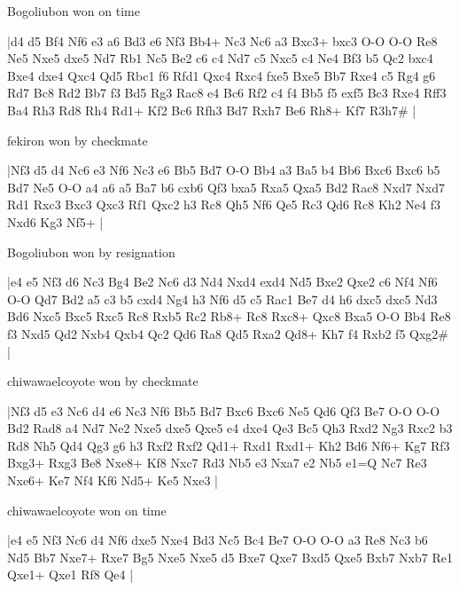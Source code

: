 \showboard

Bogoliubon won on time

\makegametitle
|d4 d5 Bf4 Nf6 e3 a6 Bd3 e6 Nf3 Bb4+ Nc3 Nc6 a3 Bxc3+ bxc3 O-O O-O Re8 Ne5 Nxe5 dxe5 Nd7 Rb1 Nc5 Be2 c6 c4 Nd7 c5 Nxc5 c4 Ne4 Bf3 b5 Qc2 bxc4 Bxe4 dxe4 Qxc4 Qd5 Rbc1 f6 Rfd1 Qxc4 Rxc4 fxe5 Bxe5 Bb7 Rxe4 c5 Rg4 g6 Rd7 Bc8 Rd2 Bb7 f3 Bd5 Rg3 Rac8 e4 Bc6 Rf2 c4 f4 Bb5 f5 exf5 Bc3 Rxe4 Rff3 Ba4 Rh3 Rd8 Rh4 Rd1+ Kf2 Bc6 Rfh3 Bd7 Rxh7 Be6 Rh8+ Kf7 R3h7\#  |

\showboard

fekiron won by checkmate

\makegametitle
|Nf3 d5 d4 Nc6 e3 Nf6 Nc3 e6 Bb5 Bd7 O-O Bb4 a3 Ba5 b4 Bb6 Bxc6 Bxc6 b5 Bd7 Ne5 O-O a4 a6 a5 Ba7 b6 cxb6 Qf3 bxa5 Rxa5 Qxa5 Bd2 Rac8 Nxd7 Nxd7 Rd1 Rxc3 Bxc3 Qxc3 Rf1 Qxc2 h3 Rc8 Qh5 Nf6 Qe5 Rc3 Qd6 Rc8 Kh2 Ne4 f3 Nxd6 Kg3 Nf5+  |

\showboard

Bogoliubon won by resignation

\makegametitle
|e4 e5 Nf3 d6 Nc3 Bg4 Be2 Nc6 d3 Nd4 Nxd4 exd4 Nd5 Bxe2 Qxe2 c6 Nf4 Nf6 O-O Qd7 Bd2 a5 c3 b5 cxd4 Ng4 h3 Nf6 d5 c5 Rac1 Be7 d4 h6 dxc5 dxc5 Nd3 Bd6 Nxc5 Bxc5 Rxc5 Rc8 Rxb5 Rc2 Rb8+ Rc8 Rxc8+ Qxc8 Bxa5 O-O Bb4 Re8 f3 Nxd5 Qd2 Nxb4 Qxb4 Qc2 Qd6 Ra8 Qd5 Rxa2 Qd8+ Kh7 f4 Rxb2 f5 Qxg2\#  |

\showboard

chiwawaelcoyote won by checkmate

\makegametitle
|Nf3 d5 e3 Nc6 d4 e6 Nc3 Nf6 Bb5 Bd7 Bxc6 Bxc6 Ne5 Qd6 Qf3 Be7 O-O O-O Bd2 Rad8 a4 Nd7 Ne2 Nxe5 dxe5 Qxe5 e4 dxe4 Qe3 Bc5 Qh3 Rxd2 Ng3 Rxc2 b3 Rd8 Nh5 Qd4 Qg3 g6 h3 Rxf2 Rxf2 Qd1+ Rxd1 Rxd1+ Kh2 Bd6 Nf6+ Kg7 Rf3 Bxg3+ Rxg3 Be8 Nxe8+ Kf8 Nxc7 Rd3 Nb5 e3 Nxa7 e2 Nb5 e1=Q Nc7 Re3 Nxe6+ Ke7 Nf4 Kf6 Nd5+ Ke5 Nxe3  |

\showboard

chiwawaelcoyote won on time

\makegametitle
|e4 e5 Nf3 Nc6 d4 Nf6 dxe5 Nxe4 Bd3 Nc5 Bc4 Be7 O-O O-O a3 Re8 Nc3 b6 Nd5 Bb7 Nxe7+ Rxe7 Bg5 Nxe5 Nxe5 d5 Bxe7 Qxe7 Bxd5 Qxe5 Bxb7 Nxb7 Re1 Qxe1+ Qxe1 Rf8 Qe4  |

